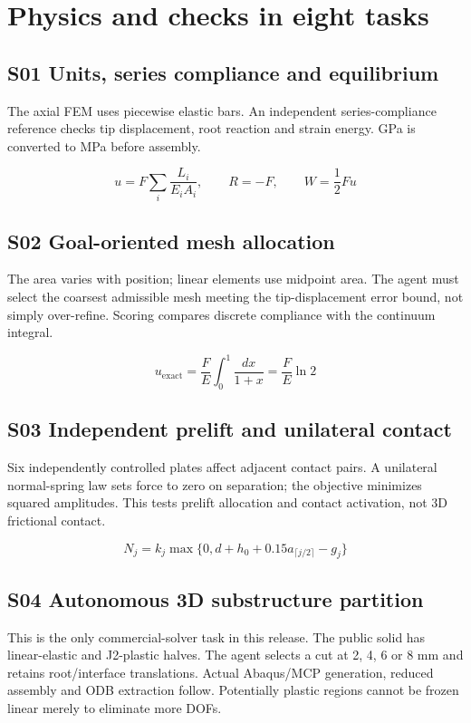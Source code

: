 \documentclass[UTF8,a4paper,11pt,fontset=windows]{ctexart}
\begin{document}
\section{Physics and checks in eight tasks}

\subsection{S01 Units, series compliance and equilibrium}

The axial FEM uses piecewise elastic bars. An independent series-compliance reference checks tip displacement, root reaction and strain energy. GPa is converted to MPa before assembly.

\[u=F\sum_i\frac{L_i}{E_i A_i},\qquad R=-F,\qquad W=\frac12 Fu\]

\subsection{S02 Goal-oriented mesh allocation}

The area varies with position; linear elements use midpoint area. The agent must select the coarsest admissible mesh meeting the tip-displacement error bound, not simply over-refine. Scoring compares discrete compliance with the continuum integral.

\[u_{\mathrm{exact}}=\frac{F}{E}\int_0^1\frac{dx}{1+x}=\frac{F}{E}\ln2\]

\subsection{S03 Independent prelift and unilateral contact}

Six independently controlled plates affect adjacent contact pairs. A unilateral normal-spring law sets force to zero on separation; the objective minimizes squared amplitudes. This tests prelift allocation and contact activation, not 3D frictional contact.

\[N_j=k_j\max\{0,d+h_0+0.15a_{\lceil j/2\rceil}-g_j\}\]

\subsection{S04 Autonomous 3D substructure partition}

This is the only commercial-solver task in this release. The public solid has linear-elastic and J2-plastic halves. The agent selects a cut at 2, 4, 6 or 8 mm and retains root/interface translations. Actual Abaqus/MCP generation, reduced assembly and ODB extraction follow. Potentially plastic regions cannot be frozen linear merely to eliminate more DOFs.
\end{document}
